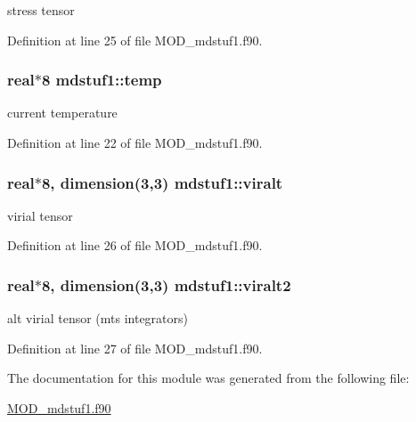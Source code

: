 stress tensor 



Definition at line 25 of file M\-O\-D\-\_\-mdstuf1.\-f90.

\hypertarget{classmdstuf1_a8dffc1a48b43cecdf7898a9d2915f64a}{
\subsubsection[{temp}]{\setlength{\rightskip}{0pt plus 5cm}real$\ast$8 mdstuf1\-::temp}}\label{classmdstuf1_a8dffc1a48b43cecdf7898a9d2915f64a}


current temperature 



Definition at line 22 of file M\-O\-D\-\_\-mdstuf1.\-f90.

\hypertarget{classmdstuf1_a9e1d656294d5f17e46669001257293e5}{
\subsubsection[{viralt}]{\setlength{\rightskip}{0pt plus 5cm}real$\ast$8, dimension(3,3) mdstuf1\-::viralt}}\label{classmdstuf1_a9e1d656294d5f17e46669001257293e5}


virial tensor 



Definition at line 26 of file M\-O\-D\-\_\-mdstuf1.\-f90.

\hypertarget{classmdstuf1_a56e3e4e4eee11aee825348758863131e}{
\subsubsection[{viralt2}]{\setlength{\rightskip}{0pt plus 5cm}real$\ast$8, dimension(3,3) mdstuf1\-::viralt2}}\label{classmdstuf1_a56e3e4e4eee11aee825348758863131e}


alt virial tensor (mts integrators) 



Definition at line 27 of file M\-O\-D\-\_\-mdstuf1.\-f90.



The documentation for this module was generated from the following file\-:\begin{DoxyCompactItemize}
\item 
\hyperlink{MOD__mdstuf1_8f90}{M\-O\-D\-\_\-mdstuf1.\-f90}\end{DoxyCompactItemize}
